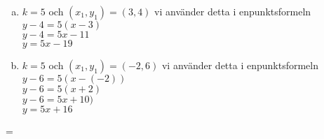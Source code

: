 \documentclass {article}
\newenvironment{absolutelynopagebreak}
  {\par\nobreak\vfil\penalty0\vfilneg
   \vtop\bgroup}
  {\par\xdef\tpd{\the\prevdepth}\egroup
   \prevdepth=\tpd}
\begin{document}
\begin{absolutelynopagebreak}
\begin{enumerate}[a)]
\item $k = 5$ och $(x_{1}, y_{1}) = (3, 4)$  vi använder detta i enpunktsformeln\\
$y - 4 = 5(x - 3)$\\
$y - 4 = 5x - 11$\\
$y = 5x - 19$
\item $k = 5$ och $(x_{1}, y_{1}) = (-2, 6)$  vi använder detta i enpunktsformeln\\
$y - 6 = 5(x - (-2))$\\
$y - 6 = 5(x + 2)$\\
$y - 6 = 5x + 10)$\\
$y = 5x + 16$

\end{enumerate}
\end{absolutelynopagebreak}
\end{document}
